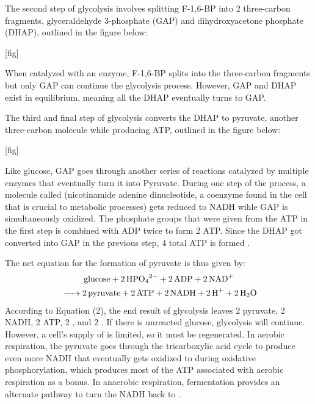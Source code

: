 \documentclass[12pt]{article}
\begin{document}
\medskip

The second step of glycolysis involves splitting F-1,6-BP into 2 three-carbon fragments, glyceraldehyde 3-phosphate (GAP) and dihydroxyacetone phosphate (DHAP), outlined in the figure below:

\medskip

[fig]

\medskip

When catalyzed with an enzyme, F-1,6-BP splits into the three-carbon fragments but only GAP can continue the glycolysis process. However, GAP and DHAP exist in equilibrium, meaning all the DHAP eventually turns to GAP.

\medskip

The third and final step of glycolysis converts the DHAP to pyruvate, another three-carbon molecule while producing ATP, outlined in the figure below:

\medskip

[fig]

\medskip

Like glucose, GAP goes through another series of reactions catalyzed by multiple enzymes that eventually turn it into Pyruvate. During one step of the process, a molecule called  (nicotinamide adenine dinucleotide, a coenzyme found in the cell that is crucial to metabolic processes) \parencite{ref} gets reduced to NADH wihle GAP is simultaneously oxidized. The phosphate groups that were given from the ATP in the first step is combined with ADP twice to form 2 ATP. Since the DHAP got converted into GAP in the previous step, 4 total ATP is formed \parencite{ref}.

\medskip

The net equation for the formation of pyruvate is thus given by:
\begin{multline}
    \ce{glucose + 2HPO4^{2-} + 2ADP + 2NAD+ \\-> 2pyruvate + 2ATP + 2 NADH + 2H+ + 2H2O}
\end{multline} %
According to Equation (2), the end result of glycolysis leaves 2 pyruvate, 2 NADH, 2 ATP, 2 , and 2 . If there is unreacted glucose, glycolysis will continue. However, a cell's supply of  is limited, so it must be regenerated. In aerobic respiration, the pyruvate goes through the tricarboxylic acid cycle to produce even more NADH that eventually gets oxidized to  during oxidative phosphorylation, which produces most of the ATP associated with aerobic respiration as a bonus. In anaerobic respiration, fermentation provides an alternate pathway to turn the NADH back to .
\end{document}
